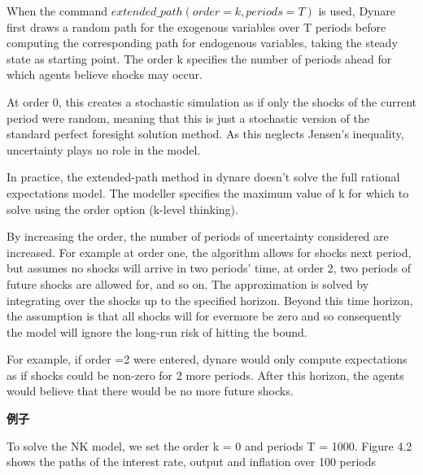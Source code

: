 \documentclass[cn,10pt,math=newtx,citestyle=gb7714-2015,bibstyle=gb7714-2015]{elegantbook}
\begin{document}
When the command $extended\_path(order=k,periods=T)$ is used, Dynare first draws a random path for the exogenous variables over T periods before computing the corresponding path for endogenous variables, taking the steady state as starting
point. The order k specifies the number of periods ahead for which agents believe shocks may occur.

At order 0, this creates a stochastic simulation as if only the shocks of the current period were random, meaning that this is just a stochastic version of the standard perfect foresight solution method. As this neglects Jensen’s inequality, uncertainty plays no role in the model.

In practice, the extended-path method in dynare doesn't solve the full rational expectations model. The modeller specifies the maximum value of k for which to solve using the order option (k-level thinking).

By increasing the order, the number of periods of uncertainty
considered are increased. For example at order one, the algorithm allows for shocks next period, but assumes no shocks will arrive in two periods’ time, at order 2, two periods of future shocks are allowed for, and so on. The approximation
is solved by integrating over the shocks up to the specified horizon. Beyond this time horizon, the assumption is that all shocks will for evermore be zero and so consequently the model will ignore the long-run risk of hitting the bound.

For example, if order =2 were entered, dynare would only compute expectations as if shocks could be non-zero for 2 more periods. After this horizon, the agents would believe that there would be no more future shocks.

\textbf{例子}

To solve the NK model, we set the order k = 0 and periods T = 1000. Figure 4.2 shows the paths of the interest rate, output and inflation over 100 periods
\end{document}
